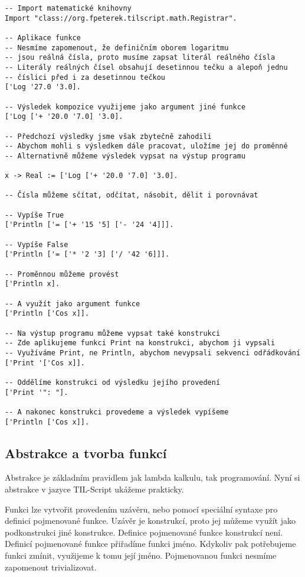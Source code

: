 \begin{lstlisting}[caption={Aritmetika v jazyce TIL-Script}]
-- Import matematické knihovny
Import "class://org.fpeterek.tilscript.math.Registrar".

-- Aplikace funkce
-- Nesmíme zapomenout, že definičním oborem logaritmu
-- jsou reálná čísla, proto musíme zapsat literál reálného čísla
-- Literály reálných čísel obsahují desetinnou tečku a alepoň jednu
-- číslici před i za desetinnou tečkou
['Log '27.0 '3.0].

-- Výsledek kompozice využijeme jako argument jiné funkce
['Log ['+ '20.0 '7.0] '3.0].

-- Předchozí výsledky jsme však zbytečně zahodili
-- Abychom mohli s výsledkem dále pracovat, uložíme jej do proměnné
-- Alternativně můžeme výsledek vypsat na výstup programu

x -> Real := ['Log ['+ '20.0 '7.0] '3.0].

-- Čísla můžeme sčítat, odčítat, násobit, dělit i porovnávat

-- Vypíše True
['Println ['= ['+ '15 '5] ['- '24 '4]]].

-- Vypíše False
['Println ['= ['* '2 '3] ['/ '42 '6]]].

-- Proměnnou můžeme provést
['Println x].

-- A využít jako argument funkce
['Println ['Cos x]].

-- Na výstup programu můžeme vypsat také konstrukci
-- Zde aplikujeme funkci Print na konstrukci, abychom ji vypsali
-- Využíváme Print, ne Println, abychom nevypsali sekvenci odřádkování
['Print '['Cos x]].

-- Oddělíme konstrukci od výsledku jejího provedení
['Print '": "].

-- A nakonec konstrukci provedeme a výsledek vypíšeme
['Println ['Cos x]].
\end{lstlisting}

\subsection{Abstrakce a tvorba funkcí}

Abstrakce je základním pravidlem jak lambda kalkulu, tak programování. Nyní si abstrakce v jazyce
TIL-Script ukážeme prakticky.

Funkci lze vytvořit provedením uzávěru, nebo pomocí speciální syntaxe pro definici pojmenované
funkce. Uzávěr je konstrukcí, proto jej můžeme využít jako podkonstrukci jiné konstrukce. Definice
pojmenované funkce konstrukcí není. Definicí pojmenované funkce přiřadíme funkci jméno. Kdykoliv
pak potřebujeme funkci zmínit, využijeme k tomu její jméno. Pojmenovanou funkci nesmíme zapomenout
trivializovat.

